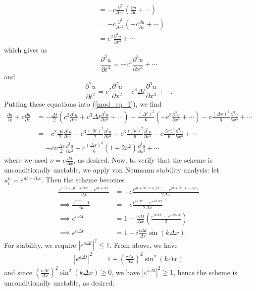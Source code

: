 \documentclass{article}
\begin{document}
\begin{itemize}
\begin{align*}
        &= -c\frac{\partial^2}{\partial x^2}\left(\frac{\partial u}{\partial t} + \cdots\right)\\
        &= -c\frac{\partial^2}{\partial x^2}\left(-c\frac{\partial u}{\partial x} + \cdots\right)\\
        &=c^2\frac{\partial^3u}{\partial x^3} + \cdots
    \end{align*}
    which gives us
    \[\frac{\partial^3u}{\partial t^3} = -c^3\frac{\partial^3u}{\partial x^3} + \cdots\]
    and
    \[\frac{\partial^2u}{\partial t^2} = c^2\frac{\partial^2 u}{\partial x^2} + c^3\Delta t\frac{\partial^3u}{\partial x^3} + \cdots.\]
    Putting these equations into (\ref{mod_eq_1}), we find
    \begin{align*}
        \frac{\partial u}{\partial t} + c\frac{\partial u}{\partial x} &= -\frac{\Delta t}{2}\left(c^2\frac{\partial^2u}{\partial x^2} + c^3\Delta t\frac{\partial^3 u}{\partial x^3} + \cdots\right) - \frac{(\Delta t)^2}{6}\left(-c^3\frac{\partial^3u}{\partial x^3} + \cdots\right) - c\frac{(\Delta x)^2}{6}\frac{\partial^3u}{\partial x^3} + \cdots\\
        &= -c^2\frac{\Delta t}{2}\frac{\partial^2u}{\partial x^2} - c^3\frac{(\Delta t)^2}{2}\frac{\partial^3u}{\partial x^3} + c^3\frac{(\Delta t)^2}{6}\frac{\partial^3u}{\partial x^3} - c\frac{\Delta x)^2}{6}\frac{\partial^3u}{\partial x^3} + \cdots\\
       &= -c\nu\frac{\Delta x}{2}\frac{\partial^2u}{\partial x^2} - c\frac{(\Delta x)^2}{6}(1 + 2\nu^2)\frac{\partial^3 u}{\partial x^3} + \cdots
    \end{align*}
    where we used $\nu = c\frac{\Delta t}{\Delta x}$, as desired.
    \newline\newline
    Now, to verify that the scheme is unconditionally unstable, we apply von Neumann stability analysis: let $u_i^n = e^{at + ikx}$. Then the scheme becomes
    \begin{align*}
        \frac{e^{a(t + \Delta t) + ikx} - e^{at + ikx}}{\Delta t} &= -c\frac{e^{at + ik(x + \Delta x)} - e^{at + ik(x - \Delta x)}}{2\Delta x}\\
        \implies \frac{e^{a\Delta t} - 1}{\Delta t} &= -c \frac{e^{ik\Delta x} - e^{-ik\Delta x}}{2\Delta x}\\
        \implies e^{a\Delta t} &= 1 - \frac{c\Delta t}{\Delta x}\left(\frac{e^{ik\Delta x} - e^{-ik\Delta x}}{2}\right)\\
        \implies e^{a\Delta t} &= 1 - i\frac{c\Delta t}{\Delta x}\sin(k\Delta x).
    \end{align*}
    For stability, we require $|e^{a\Delta t}|^2 \leq 1$. From above, we have
    \begin{align*}
        \left|e^{a\Delta t}\right|^2 &= 1 + \left(\frac{c\Delta t}{\Delta x}\right)^2\sin^2(k\Delta x)
    \end{align*}
    and since $\left(\frac{c\Delta t}{\Delta x}\right)^2\sin^2(k\Delta x) \geq 0$, we have $|e^{a\Delta t}|^2 \geq 1$, hence the scheme is unconditionally unstable, as desired.


\end{itemize}
\end{document}
